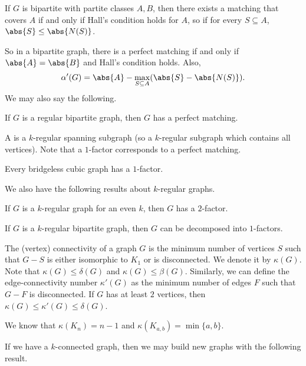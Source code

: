 \begin{theorem}[Hall]
  If $G$ is bipartite with partite classes $A, B$, then there exists a matching
  that covers $A$ if and only if Hall's condition holds for $A$, so if for every
  $S \subseteq A$, $\abs{S} \le \abs{N(S)}$.
\end{theorem}

So in a bipartite graph, there is a perfect matching if and only if $\abs{A} =
\abs{B}$ and Hall's condition holds.
Also,
\[
  \alpha'(G) = \abs{A} - \max_{S \subseteq A} (\abs{S} - \abs{N(S)}).
\]
We may also say the following.

\begin{theorem}
  If $G$ is a regular bipartite graph, then $G$ has a perfect matching.
\end{theorem}


A  is a $k$-regular spanning subgraph (so a $k$-regular
subgraph which contains all vertices).
Note that a $1$-factor corresponds to a perfect matching.

\begin{theorem}[Petersen]
  Every bridgeless cubic graph has a $1$-factor.
\end{theorem}

We also have the following results about $k$-regular graphs.

\begin{theorem}
  If $G$ is a $k$-regular graph for an even $k$, then $G$ has a $2$-factor.
\end{theorem}

\begin{theorem}
  If $G$ is a $k$-regular bipartite graph, then $G$ can be decomposed into
  $1$-factors.
\end{theorem}


The (vertex) connectivity of a graph $G$ is the minimum number of vertices $S$
such that $G-S$ is either isomorphic to $K_1$ or is disconnected.
We denote it by $\kappa(G)$.
Note that $\kappa(G) \le \delta(G)$ and $\kappa(G) \le \beta(G)$.
Similarly, we can define the edge-connectivity number $\kappa'(G)$ as the
minimum number of edges $F$ such that $G -F$ is disconnected.
If $G$ has at least $2$ vertices, then $\kappa(G) \le \kappa'(G) \le \delta(G)$.

We know that $\kappa(K_n) = n-1$ and $\kappa(K_{a,b}) = \min\{a,b\}$.

If we have a $k$-connected graph, then we may build new graphs with the
following result.

